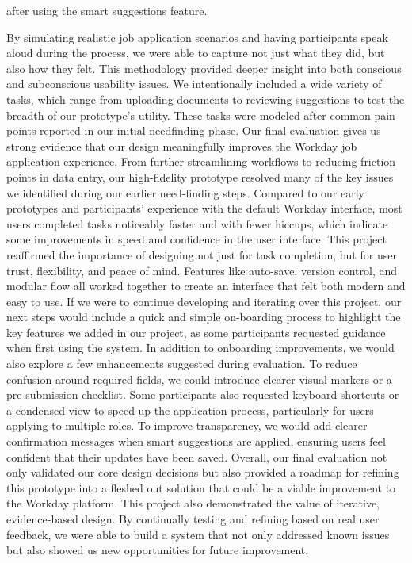 \documentclass[
	letterpaper, %
]{jdf}
\begin{document}
\begin{sloppypar}
after using the smart suggestions feature.

By simulating realistic job application scenarios and having participants speak aloud during the process, we were able to capture not just what they did, but also how they felt. This methodology provided deeper insight into both conscious and subconscious usability issues. We intentionally included a wide variety of tasks, which range from uploading documents to reviewing suggestions to test the breadth of our prototype’s utility. These tasks were modeled after common pain points reported in our initial needfinding phase. Our final evaluation gives us strong evidence that our design meaningfully improves the Workday job application experience. From further streamlining workflows to reducing friction points in data entry, our high-fidelity prototype resolved many of the key issues we identified during our earlier need-finding steps. Compared to our early prototypes and participants’ experience with the default Workday interface, most users completed tasks noticeably faster and with fewer hiccups, which indicate some improvements in speed and confidence in the user interface. This project reaffirmed the importance of designing not just for task completion, but for user trust, flexibility, and peace of mind. Features like auto-save, version control, and modular flow all worked together to create an interface that felt both modern and easy to use. If we were to continue developing and iterating over this project, our next steps would include a quick and simple on-boarding process to highlight the key features we added in our project, as some participants requested guidance when first using the system. In addition to onboarding improvements, we would also explore a few enhancements suggested during evaluation. To reduce confusion around required fields, we could introduce clearer visual markers or a pre-submission checklist. Some participants also requested keyboard shortcuts or a condensed view to speed up the application process, particularly for users applying to multiple roles. To improve transparency, we would add clearer confirmation messages when smart suggestions are applied, ensuring users feel confident that their updates have been saved. Overall, our final evaluation not only validated our core design decisions but also provided a roadmap for refining this prototype into a fleshed out solution that could be a viable improvement to the Workday platform. This project also demonstrated the value of iterative, evidence-based design. By continually testing and refining based on real user feedback, we were able to build a system that not only addressed known issues but also showed us new opportunities for future improvement.
\newpage


\end{sloppypar}
\end{document}
